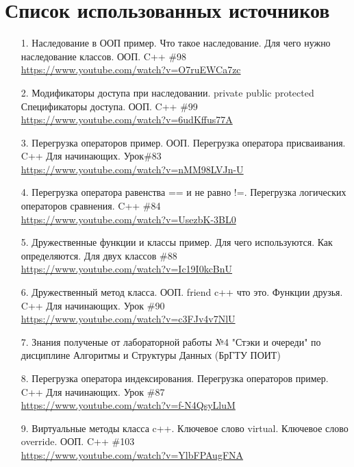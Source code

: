 \section*{Список использованных источников} %

\begin{enumerate}
    \item [1.] Наследование в ООП пример. Что такое наследование. Для чего нужно наследование классов. ООП. C++ \#98
    \\\url{https://www.youtube.com/watch?v=O7ruEWCa7zc}
    \item [2.] Модификаторы доступа при наследовании. private public protected Спецификаторы доступа. ООП. C++ \#99
    \\\url{https://www.youtube.com/watch?v=6udKffus77A}
    \item [3.] Перегрузка операторов пример. ООП. Перегрузка оператора присваивания. C++ Для начинающих. Урок\#83
    \\\url{https://www.youtube.com/watch?v=nMM98LVJn-U}
    \item [4.] Перегрузка оператора равенства == и не равно !=. Перегрузка логических операторов сравнения. C++ \#84
    \\\url{https://www.youtube.com/watch?v=UsezbK-3BL0}
    \item [5.] Дружественные функции и классы пример. Для чего используются. Как определяются. Для двух классов \#88
    \\\url{https://www.youtube.com/watch?v=Ic19I0kcBnU}
    \item [6.] Дружественный метод класса. ООП. friend c++ что это. Функции друзья. C++ Для начинающих. Урок \#90
    \\\url{https://www.youtube.com/watch?v=c3FJv4v7NlU}
    \item [7.] Знания полученые от лабораторной работы №4 "Стэки и очереди" по дисциплине Алгоритмы и Структуры Данных (БрГТУ ПОИТ)
    \item [8.] Перегрузка оператора индексирования. Перегрузка операторов пример. C++ Для начинающих. Урок \#87
    \\\url{https://www.youtube.com/watch?v=f-N4QsyLluM}
    \item [9.] Виртуальные методы класса c++. Ключевое слово virtual. Ключевое слово override. ООП. C++ \#103
    \\\url{https://www.youtube.com/watch?v=YlbFPAugFNA}
\end{enumerate}